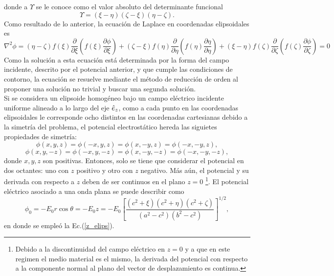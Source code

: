 donde a $\Upsilon$ se le conoce como el valor absoluto del determinante funcional \cite{Kellogg}
\begin{equation}
	\Upsilon=(\xi-\eta)(\zeta-\xi)(\eta-\zeta).
\end{equation}
Como resultado de lo anterior, la ecuación de Laplace en coordenadas elipsoidales es
\begin{equation}
	\nabla^2\phi=(\eta-\zeta)f(\xi)\frac{\partial}{\partial\xi}\left(f(\xi)\frac{\partial\phi}{\partial\xi}\right)+(\zeta-\xi)f(\eta)\frac{\partial}{\partial\eta}\left(f(\eta)\frac{\partial\eta}{\partial\eta}\right)+(\xi-\eta)f(\zeta)\frac{\partial}{\partial\zeta}\left(f(\zeta)\frac{\partial\phi}{\partial\zeta}\right)=0
	\label{laplaceplisoidal}
\end{equation}
Como la solución a esta ecuación está determinada por la forma del campo
incidente, descrito por el potencial anterior, y que cumple las condiciones de contorno, la ecuación se resuelve mediante el método de reducción de orden al proponer una solución no trivial y buscar una segunda solución.\\

Si se considera un elipsoide homogéneo bajo un campo eléctrico incidente uniforme alineado a lo largo del eje $\hat{e}_{z}$, como a cada punto en las coordenadas elipsoidales le corresponde ocho distintos en las coordenadas cartesianas debido a la simetría del problema, el potencial electrostático hereda las siguietes propiedades de simetría:
\begin{equation}
    \phi(x,y,z)=\phi(-x,y,z)=\phi(x,-y,z)=\phi(-x,-y,z),
\end{equation}
\begin{equation}
    \phi(x,y,-z)=\phi(-x,y,-z)=\phi(x,-y,-z)=\phi(-x,-y,-z),
\end{equation}
donde $x,y,z$ son positivas. Entonces, solo se tiene que considerar el potencial en dos octantes: uno con $z$ positivo y otro con $z$ negativo. Más aún, el potencial y su derivada con respecto a $z$ deben de ser continuos en el plano $z=0$ \footnote{Debido a la discontinuidad del campo eléctrico en $z=0$ y a que en este regimen el medio material es el mismo, la derivada del potencial con respecto a la componente normal al plano del vector de desplazamiento es continua.}. El potencial eléctrico asociado a una onda plana se puede describir como
\begin{equation}
\phi_0=-E_0 r\cos\theta=-E_0 z=-E_0\left[\frac{(c^2+\xi)(c^2+\eta)(c^2+\zeta)}{(a^2-c^2)(b^2-c^2)}\right]^{1/2},
\label{pot_0}
\end{equation}
en donde se empleó la Ec.(\ref{z_elips}).\\

